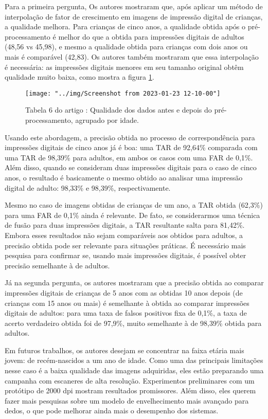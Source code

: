 \documentclass[12pt,a4paper]{article}
\begin{document}
Para a primeira pergunta, Os autores mostraram que, após aplicar um método de interpolação de fator de crescimento em imagens de impressão digital de crianças, a qualidade melhora. Para crianças de cinco anos, a qualidade obtida após o pré-processamento é melhor do que a obtida para impressões digitais de adultos (48,56 vs 45,98), e mesmo a qualidade obtida para crianças com dois anos ou mais é comparável (42,83). Os autores também mostraram que essa interpolação é necessária: as impressões digitais menores em seu tamanho original obtêm qualidade muito baixa, como mostra a figura \ref{quality-table}.

\begin{figure}
	\centering
	\texttt{[image: "../img/Screenshot from 2023-01-23 12-10-00"]}
	\caption{Tabela 6 do artigo \cite{Preciozzi}: Qualidade dos dados antes e depois do pré-processamento, agrupado por idade.}
	\label{quality-table}
\end{figure}

Usando este abordagem, a precisão obtida no processo de correspondência para impressões digitais de cinco anos já é boa: uma TAR de 92,64\% comparada com uma TAR de 98,39\% para adultos, em ambos os casos com uma FAR de 0,1\%. Além disso, quando se consideram duas impressões digitais para o caso de cinco anos, o resultado é basicamente o mesmo obtido ao analisar uma impressão digital de adulto: 98,33\% e 98,39\%, respectivamente.

Mesmo no caso de imagens obtidas de crianças de um ano, a TAR obtida (62,3\%) para uma FAR de 0,1\% ainda é relevante. De fato, se considerarmos uma técnica de fusão para duas impressões digitais, a TAR resultante salta para 81,42\%. Embora esses resultados não sejam comparáveis aos obtidos para adultos, a precisão obtida pode ser relevante para situações práticas. É necessário mais pesquisa para confirmar se, usando mais impressões digitais, é possível obter precisão semelhante à de adultos.

Já na segunda pergunta, os autores mostraram que a precisão obtida ao comparar impressões digitais de crianças de 5 anos com as obtidas 10 anos depois (de crianças com 15 anos ou mais) é semelhante à obtida ao comparar impressões digitais de adultos: para uma taxa de falsos positivos fixa de 0,1\%, a taxa de acerto verdadeiro obtida foi de 97,9\%, muito semelhante à de 98,39\% obtida para adultos.

Em futuros trabalhos, os autores desejam se concentrar na faixa etária mais jovem: de recém-nascidos a um ano de idade. Como uma das principais limitações nesse caso é a baixa qualidade das imagens adquiridas, eles estão preparando uma campanha com escaneres de alta resolução. Experimentos preliminares com um protótipo de 2000 dpi mostram resultados promissores. Além disso, eles querem fazer mais pesquisas sobre um modelo de envelhecimento mais avançado para dedos, o que pode melhorar ainda mais o desempenho dos sistemas.
\end{document}
